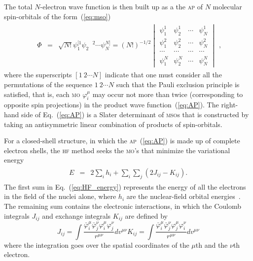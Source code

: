 The total $N$-electron wave function is then built up as a the
\textsc{ap} of $N$ molecular spin-orbitals of the
form~(\ref{eq:mso})~\cite{Roothaan_HF}
%
\begin{eqnarray}
  \begin{split}
    \Phi & = & \sqrt{N!}\psi_{1}^{[1} \psi_{2}^{\phantom{[]}2} \cdots \psi_{N}^{N]} =
    (N!)^{-1/2}
    \begin{vmatrix}
      \psi_{1}^{1} & \psi_{2}^{1} & \cdots & \psi_{N}^{1} \\
      \psi_{1}^{2} & \psi_{2}^{2} & \cdots & \psi_{N}^{2} \\
      \cdots & \cdots & \cdots & \cdots \\
      \psi_{1}^{N} & \psi_{2}^{N} & \cdots & \psi_{N}^{N}
    \end{vmatrix}
  \end{split},
  \label{eq:AP}
\end{eqnarray}
%
where the superscripts $[1\ 2 \cdots N]$ indicate that one must
consider all the permutations of the sequence $1\ 2 \cdots N$ such
that the Pauli exclusion principle is satisfied, that is, each
\textsc{mo} $\varphi_{i}^{\mu}$ may occur not more than twice
(corresponding to opposite spin projections) in the product wave
function~(\ref{eq:AP}). The right-hand side of Eq.~(\ref{eq:AP}) is a
Slater determinant of \textsc{mso}s that is constructed by taking an
antisymmetric linear combination of products of spin-orbitals.

For a closed-shell structure, in which the \textsc{ap}~(\ref{eq:AP})
is made up of complete electron shells, the \textsc{hf} method seeks
the \textsc{mo}'s that minimize the variational
energy~\cite{Roothaan_HF}
%
\begin{eqnarray}
  \begin{split}
    E & = & 2\sum\limits_{i} h_{i} + \sum\limits_{i}\sum\limits_{j} (2J_{ij} -
    K_{ij}).
  \end{split}
  \label{eq:HF_energy}
\end{eqnarray}
%
The first sum in Eq.~(\ref{eq:HF_energy}) represents the energy of all
the electrons in the field of the nuclei alone, where $h_{i}$ are the
nuclear-field orbital energies~\cite{Roothaan_HF}. The remaining sum
contains the electronic interactions, in which the Coulomb integrals
$J_{ij}$ and exchange integrals $K_{ij}$ are defined by
%
\begin{subequations}
  \begin{equation} \label{eq:Coulomb}
    J_{ij} = \int \frac{\bar\varphi_{i}^{\mu} \bar\varphi_{j}^{\nu}
      \varphi_{i}^{\mu} \varphi_{j}^{\nu}}{r^{\mu\nu}} dv^{\mu\nu}
  \end{equation}
  \begin{equation} \label{eq:exchange}
    K_{ij} = \int \frac{\bar\varphi_{i}^{\mu} \bar\varphi_{j}^{\nu}
      \varphi_{j}^{\mu} \varphi_{i}^{\nu}}{r^{\mu\nu}} dv^{\mu\nu}
  \end{equation}
\end{subequations}
%
where the integration goes over the spatial coordinates of the
$\mu$th and the $\nu$th electron.

